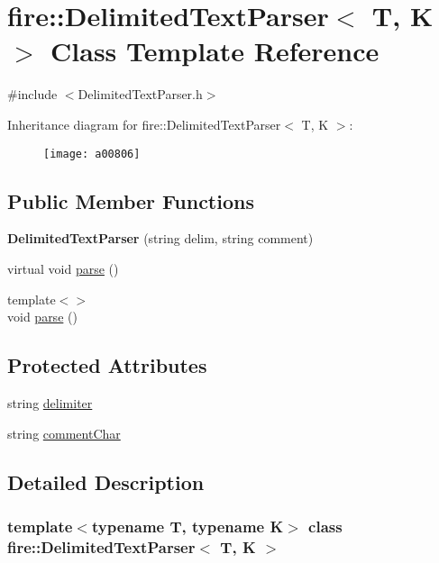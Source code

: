 \hypertarget{a00806}{}\section{fire\+:\+:Delimited\+Text\+Parser$<$ T, K $>$ Class Template Reference}
\label{a00806}


{\ttfamily \#include $<$Delimited\+Text\+Parser.\+h$>$}

Inheritance diagram for fire\+:\+:Delimited\+Text\+Parser$<$ T, K $>$\+:\begin{figure}[H]
\begin{center}
\leavevmode
\texttt{[image: a00806]}
\end{center}
\end{figure}
\subsection*{Public Member Functions}
\begin{DoxyCompactItemize}
\item 
\mbox{\label{a00806_aa1f041ebbf0bf72145e8bd20bf95f3f4}} 
{\bfseries Delimited\+Text\+Parser} (string delim, string comment)
\item 
virtual void \hyperlink{a00806_a686df5548771cae833d5e721442a821a}{parse} ()
\item 
{\footnotesize template$<$$>$ }\\void \hyperlink{a00806_a773fa7ed28cb9d8c384ad94bd81fc93f}{parse} ()
\end{DoxyCompactItemize}
\subsection*{Protected Attributes}
\begin{DoxyCompactItemize}
\item 
string \hyperlink{a00806_ac817fc333b53611a41f446977461bdbf}{delimiter}
\item 
string \hyperlink{a00806_acdd7b27b8109ed41e7d9bc5e6de72e93}{comment\+Char}
\end{DoxyCompactItemize}


\subsection{Detailed Description}
\subsubsection*{template$<$typename T, typename K$>$\newline
class fire\+::\+Delimited\+Text\+Parser$<$ T, K $>$}

